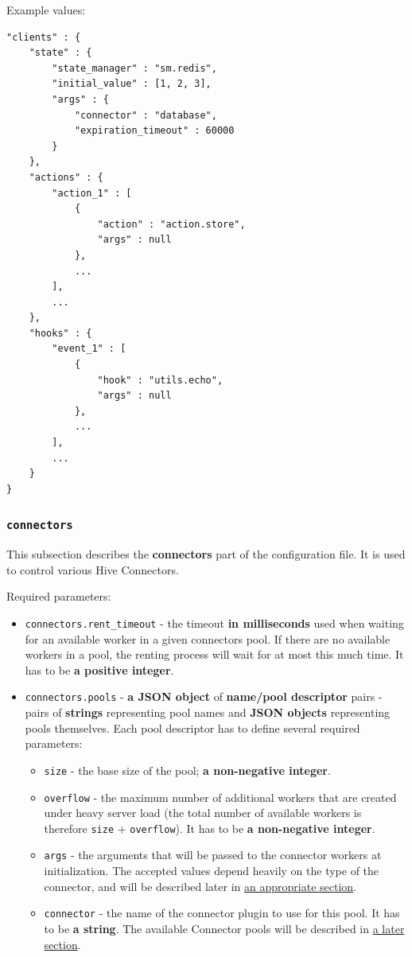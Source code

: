 \documentclass[a4paper]{article}
\begin{document}
\noindent
Example values:


\begin{verbatim}
"clients" : {
    "state" : {
        "state_manager" : "sm.redis",
        "initial_value" : [1, 2, 3],
        "args" : {
            "connector" : "database",
            "expiration_timeout" : 60000
        }
    },
    "actions" : {
        "action_1" : [
            {
                "action" : "action.store",
                "args" : null
            },
            ...
        ],
        ...
    },
    "hooks" : {
        "event_1" : [
            {
                "hook" : "utils.echo",
                "args" : null
            },
            ...
        ],
        ...
    }
}
\end{verbatim}
\subsubsection{\texttt{connectors}}
\label{sec-3-1-4}

This subsection describes the \textbf{connectors} part of the configuration file. It is used to control various Hive Connectors.

\noindent
Required parameters:

\begin{itemize}
\item \texttt{connectors.rent\_timeout} - the timeout \textbf{in milliseconds} used when waiting for an available worker in a given connectors pool. If there are no available workers in a pool, the renting process will wait for at most this much time. It has to be \textbf{a positive integer}.
\end{itemize}

\label{ref-connectors_config}

\begin{itemize}
\item \texttt{connectors.pools} - \textbf{a JSON object} of \textbf{name/pool descriptor} pairs - pairs of \textbf{strings} representing pool names and \textbf{JSON objects} representing pools themselves. Each pool descriptor has to define several required parameters:
\begin{itemize}
\item \texttt{size} - the base size of the pool; \textbf{a non-negative integer}.
\item \texttt{overflow} - the maximum number of additional workers that are created under heavy server load (the total number of available workers is therefore \texttt{size} + \texttt{overflow}). It has to be \textbf{a non-negative integer}.
\item \texttt{args} - the arguments that will be passed to the connector workers at initialization. The accepted values depend heavily on the type of the connector, and will be described later in \hyperref[sec-8-4]{an appropriate section}.
\item \texttt{connector} - the name of the connector plugin to use for this pool. It has to be \textbf{a string}. The available Connector pools will be described in \hyperref[sec-8-4]{a later section}.
\end{itemize}
\end{itemize}
\end{document}
